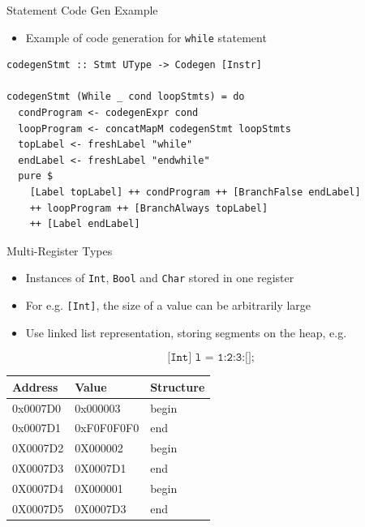 \documentclass[dvipsnames,aspectratio=169]{beamer}
\begin{document}
\begin{frame}[fragile]{Statement Code Gen Example}

  \begin{itemize}
    \item Example of code generation for \texttt{while} statement
  \end{itemize}

\begin{verbatim}
codegenStmt :: Stmt UType -> Codegen [Instr]

codegenStmt (While _ cond loopStmts) = do
  condProgram <- codegenExpr cond
  loopProgram <- concatMapM codegenStmt loopStmts
  topLabel <- freshLabel "while"
  endLabel <- freshLabel "endwhile"
  pure $
    [Label topLabel] ++ condProgram ++ [BranchFalse endLabel]
    ++ loopProgram ++ [BranchAlways topLabel]
    ++ [Label endLabel]
\end{verbatim}

\end{frame}


\begin{frame}[fragile]{Multi-Register Types}
  \begin{itemize}
    \item Instances of \texttt{Int}, \texttt{Bool} and \texttt{Char} stored in
          one register
    \item For e.g. \texttt{[Int]}, the size of a value can be arbitrarily large
    \item Use linked list representation, storing segments on the heap, e.g.
  \end{itemize}\vspace{-6mm}

  \[ \texttt{[Int] l = 1:2:3:[];} \]

  \begin{table}[]
    \begin{tabular}{>{\ttfamily}l| >{\ttfamily}l|l}
      \textbf{\textsf{Address}} & \textbf{\textsf{Value}} & \textbf{Structure} \\
      \hline
      0x0007D0 & 0x000003 & begin \\
      0x0007D1 & 0xF0F0F0F0 & end \\
      \hline
      0X0007D2 & 0X000002 & begin \\
      0X0007D3 & 0X0007D1 & end \\
      \hline
      0X0007D4 & 0X000001 & begin \\
      0X0007D5 & 0X0007D3 & end
    \end{tabular}
  \end{table}

\end{frame}
\end{document}
